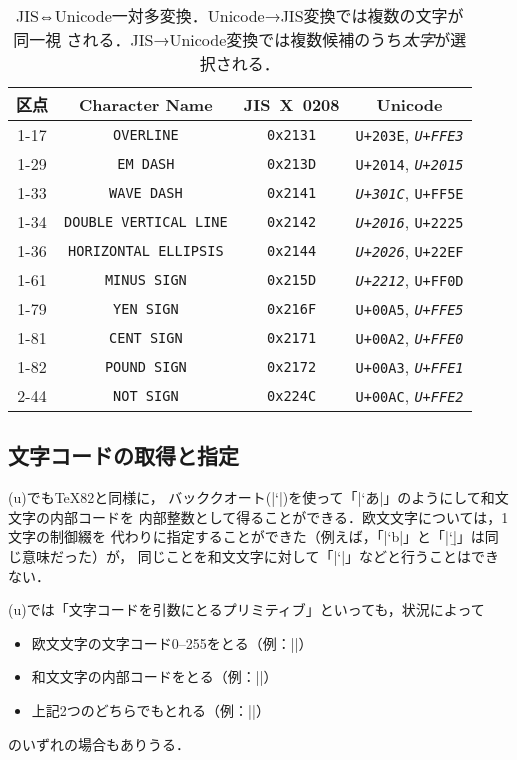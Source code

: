 \documentclass[a4paper,11pt,nomag,dvipdfmx]{jsarticle}
\def\code#1{\texttt{#1}}
\begin{document}
\begin{table}[tbp]
\caption{JIS⇔Unicode一対多変換．Unicode→JIS変換では複数の文字が同一視
される．JIS→Unicode変換では複数候補のうち\emph{太字}が選択される．}
\label{table:jis_uni_var}
\centering\small
\begin{tabular}{cccc}
\toprule
区点 & Character Name   & JIS~X~0208    & Unicode \\
\midrule
1-17 & \code{OVERLINE}
  & \code{0x2131} & \code{U+203E}, \emph{\code{U+FFE3}} \\
1-29 & \code{EM DASH}
  & \code{0x213D} & \code{U+2014}, \emph{\code{U+2015}} \\ %
1-33 & \code{WAVE DASH}
  & \code{0x2141} & \emph{\code{U+301C}}, \code{U+FF5E} \\ %
1-34 & \code{DOUBLE VERTICAL LINE}
  & \code{0x2142} & \emph{\code{U+2016}}, \code{U+2225} \\ %
1-36 & \code{HORIZONTAL ELLIPSIS}
  & \code{0x2144} & \emph{\code{U+2026}}, \code{U+22EF} \\
1-61 & \code{MINUS SIGN}
  & \code{0x215D} & \emph{\code{U+2212}}, \code{U+FF0D} \\ %
1-79 & \code{YEN SIGN}
  & \code{0x216F} & \code{U+00A5}, \emph{\code{U+FFE5}} \\
1-81 & \code{CENT SIGN}
  & \code{0x2171} & \code{U+00A2}, \emph{\code{U+FFE0}} \\ %
1-82 & \code{POUND SIGN}
  & \code{0x2172} & \code{U+00A3}, \emph{\code{U+FFE1}} \\ %
2-44 & \code{NOT SIGN}
  & \code{0x224C} & \code{U+00AC}, \emph{\code{U+FFE2}} \\ %
\bottomrule
\end{tabular}
\end{table}

\subsection{文字コードの取得と指定}
(u)\pTeX でも\TeX82と同様に，
バッククオート(|`|)を使って「|`あ|」のようにして和文文字の内部コードを
内部整数として得ることができる．欧文文字については，1文字の制御綴を
代わりに指定することができた（例えば，「|`b|」と「|`\b|」は同じ意味だった）が，
同じことを和文文字に対して「|`\あ|」などと行うことはできない．

(u)\pTeX では「文字コードを引数にとるプリミティブ」といっても，状況によって
\begin{itemize}
 \item 欧文文字の文字コード0--255をとる（例：|\catcode|）
 \item 和文文字の内部コードをとる（例：|\inhibitxspcode|）
 \item 上記2つのどちらでもとれる（例：|\prebreakpenalty|）
\end{itemize}
のいずれの場合もありうる．
\end{document}

